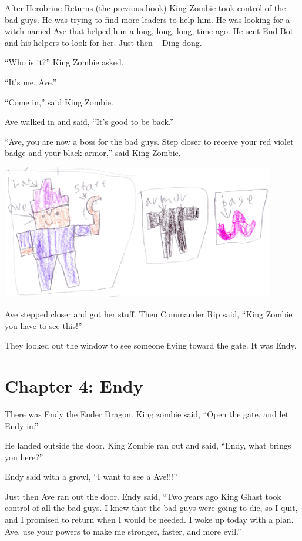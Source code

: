 \documentclass[12pt,oneside]{krantz}
\begin{document}
After Herobrine Returns (the previous book) King Zombie took control of
the bad guys. He was trying to find more leaders to help him. He was
looking for a witch named Ave that helped him a long, long, long, time
ago. He sent End Bot and his helpers to look for her. Just then -- Ding
dong.

``Who is it?'' King Zombie asked.

``It's me, Ave.''

``Come in,'' said King Zombie.

Ave walked in and said, ``It's good to be back.''

``Ave, you are now a boss for the bad guys. Step closer to receive your
red violet badge and your black armor,'' said King Zombie.

\includegraphics[width=4.6875in,height=\textheight]{img/four-bad-guys/avestuff.jpg}

Ave stepped closer and got her stuff. Then Commander Rip said, ``King
Zombie you have to see this!''

They looked out the window to see someone flying toward the gate. It was
Endy.

\hypertarget{chapter-4-endy}{%
\chapter*{Chapter 4: Endy}\label{chapter-4-endy}}


There was Endy the Ender Dragon. King zombie said, ``Open the gate, and
let Endy in.''

He landed outside the door. King Zombie ran out and said, ``Endy, what
brings you here?''

Endy said with a growl, ``I want to see a Ave!!!''

Just then Ave ran out the door. Endy said, ``Two years ago King Ghast
took control of all the bad guys. I knew that the bad guys were going to
die, so I quit, and I promised to return when I would be needed. I woke
up today with a plan. Ave, use your powers to make me stronger, faster,
and more evil.''
\end{document}
